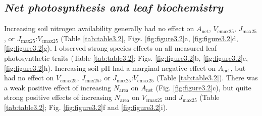 \newpage
\subsection{\textit{Net photosynthesis and leaf biochemistry}}
\noindent Increasing soil nitrogen availability generally had no effect on $A_\mathrm{net}$, $V_\mathrm{cmax25}$, $J_\mathrm{max25}$, or $J_\mathrm{max25}$:$V_\mathrm{cmax25}$ (Table \ref{tab:table3.2}, Figs. \ref{fig:figure3.2}a, \ref{fig:figure3.2}d, \ref{fig:figure3.2}g). I observed strong species effects on all measured leaf photosynthetic traits (Table \ref{tab:table3.2}; Figs. \ref{fig:figure3.2}b, \ref{fig:figure3.2}e, \ref{fig:figure3.2}h). Increasing soil pH had a marginal negative effect on $A_\mathrm{net}$, but had no effect on $V_\mathrm{cmax25}$, $J_\mathrm{max25}$, or $J_\mathrm{max25}$:$V_\mathrm{cmax25}$ (Table \ref{tab:table3.2}). There was a weak positive effect of increasing $N_\mathrm{area}$ on $A_\mathrm{net}$ (Fig. \ref{fig:figure3.2}c), but quite strong positive effects of increasing $N_\mathrm{area}$ on $V_\mathrm{cmax25}$ and $J_\mathrm{max25}$ (Table \ref{tab:table3.2}; Fig. \ref{fig:figure3.2}f and \ref{fig:figure3.2}i).
\clearpage
    
